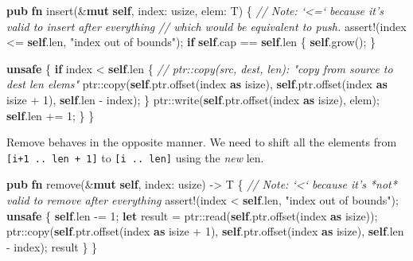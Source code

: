 \documentclass[a4paper,]{book}
\newenvironment{Shaded}{\begin{snugshade}}{\end{snugshade}}
\newcommand{\KeywordTok}[1]{\textcolor[rgb]{0.13,0.29,0.53}{\textbf{{#1}}}}
\newcommand{\DecValTok}[1]{\textcolor[rgb]{0.00,0.00,0.81}{{#1}}}
\newcommand{\StringTok}[1]{\textcolor[rgb]{0.31,0.60,0.02}{{#1}}}
\newcommand{\CommentTok}[1]{\textcolor[rgb]{0.56,0.35,0.01}{\textit{{#1}}}}
\newcommand{\OtherTok}[1]{\textcolor[rgb]{0.56,0.35,0.01}{{#1}}}
\newcommand{\NormalTok}[1]{{#1}}
\begin{document}
\begin{Shaded}
\begin{Highlighting}[]
\KeywordTok{pub} \KeywordTok{fn} \NormalTok{insert(&}\KeywordTok{mut} \KeywordTok{self}\NormalTok{, index: usize, elem: T) \{}
    \CommentTok{// Note: `<=` because it's valid to insert after everything}
    \CommentTok{// which would be equivalent to push.}
    \OtherTok{assert!}\NormalTok{(index <= }\KeywordTok{self}\NormalTok{.len, }\StringTok{"index out of bounds"}\NormalTok{);}
    \KeywordTok{if} \KeywordTok{self}\NormalTok{.cap == }\KeywordTok{self}\NormalTok{.len \{ }\KeywordTok{self}\NormalTok{.grow(); \}}

    \KeywordTok{unsafe} \NormalTok{\{}
        \KeywordTok{if} \NormalTok{index < }\KeywordTok{self}\NormalTok{.len \{}
            \CommentTok{// ptr::copy(src, dest, len): "copy from source to dest len elems"}
            \NormalTok{ptr::copy(}\KeywordTok{self}\NormalTok{.ptr.offset(index }\KeywordTok{as} \NormalTok{isize),}
                      \KeywordTok{self}\NormalTok{.ptr.offset(index }\KeywordTok{as} \NormalTok{isize + }\DecValTok{1}\NormalTok{),}
                      \KeywordTok{self}\NormalTok{.len - index);}
        \NormalTok{\}}
        \NormalTok{ptr::write(}\KeywordTok{self}\NormalTok{.ptr.offset(index }\KeywordTok{as} \NormalTok{isize), elem);}
        \KeywordTok{self}\NormalTok{.len += }\DecValTok{1}\NormalTok{;}
    \NormalTok{\}}
\NormalTok{\}}
\end{Highlighting}
\end{Shaded}

Remove behaves in the opposite manner. We need to shift all the elements
from \texttt{{[}i+1\ ..\ len\ +\ 1{]}} to \texttt{{[}i\ ..\ len{]}}
using the \emph{new} len.

\begin{Shaded}
\begin{Highlighting}[]
\KeywordTok{pub} \KeywordTok{fn} \NormalTok{remove(&}\KeywordTok{mut} \KeywordTok{self}\NormalTok{, index: usize) -> T \{}
    \CommentTok{// Note: `<` because it's *not* valid to remove after everything}
    \OtherTok{assert!}\NormalTok{(index < }\KeywordTok{self}\NormalTok{.len, }\StringTok{"index out of bounds"}\NormalTok{);}
    \KeywordTok{unsafe} \NormalTok{\{}
        \KeywordTok{self}\NormalTok{.len -= }\DecValTok{1}\NormalTok{;}
        \KeywordTok{let} \NormalTok{result = ptr::read(}\KeywordTok{self}\NormalTok{.ptr.offset(index }\KeywordTok{as} \NormalTok{isize));}
        \NormalTok{ptr::copy(}\KeywordTok{self}\NormalTok{.ptr.offset(index }\KeywordTok{as} \NormalTok{isize + }\DecValTok{1}\NormalTok{),}
                  \KeywordTok{self}\NormalTok{.ptr.offset(index }\KeywordTok{as} \NormalTok{isize),}
                  \KeywordTok{self}\NormalTok{.len - index);}
        \NormalTok{result}
    \NormalTok{\}}
\NormalTok{\}}
\end{Highlighting}
\end{Shaded}
\end{document}
